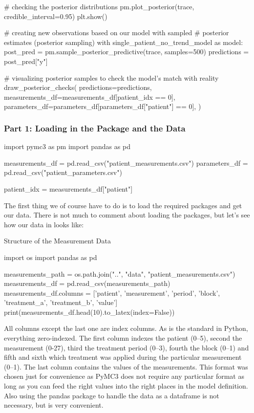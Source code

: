 \documentclass[12pt,a4paper,leqno]{report}
\theoremstyle{plain}
\theoremstyle{definition}
\theoremstyle{remark}
\begin{document}
\begin{pyverbatim}[][fontsize=\footnotesize]
    # checking the posterior distributions
    pm.plot_posterior(trace, credible_interval=0.95)
    plt.show()

 
# creating new observations based on our model with sampled
# posterior estimates (posterior sampling)
with single_patient_no_trend_model as model:
    post_pred = pm.sample_posterior_predictive(trace, samples=500)
    predictions = post_pred["y"]

# visualizing posterior samples to check the model's match with reality
draw_posterior_checks(
    predictions=predictions,
    measurements_df=measurements_df[patient_idx == 0],
    parameters_df=parameters_df[parameters_df["patient"] == 0],
)
\end{pyverbatim}
\smallskip

\subsubsection*{Part 1: Loading in the Package and the Data}

\bigskip
\begin{pyverbatim}[][fontsize=\footnotesize]
import pymc3 as pm
import pandas as pd

measurements_df = pd.read_csv("patient_measurements.csv")
parameters_df = pd.read_csv("patient_parameters.csv")

patient_idx = measurements_df["patient"]
\end{pyverbatim}
\smallskip

The first thing we of course have to do is to load the required packages and get our data. There is
not much to comment about loading the packages, but let's see how our data in
 looks like:

\bigskip
\begin{table}[H]
\caption{Structure of the Measurement Data}\label{measurements}
\bigskip
\centering
\begin{pycode}
import os
import pandas as pd

measurements_path = os.path.join("..", "data", "patient_measurements.csv")
measurements_df = pd.read_csv(measurements_path)
measurements_df.columns = ['patient', 'measurement', 'period', 'block',
'treatment_a', 'treatment_b', 'value']
print(measurements_df.head(10).to_latex(index=False))
\end{pycode}
\end{table}
\bigskip

All columns except the last one are index columns. As is the standard in Python, everything
zero-indexed. The first column indexes the patient (0--5), second the
measurement (0-27), third the treatment period (0--3), fourth the block (0--1) and fifth
and sixth which treatment was applied during the particular measurement (0--1). The last
column contains the values of the measurements. This format was chosen just for
convenience as PyMC3 does not require any particular format as long as you can feed the right values into
the right places in the model definition. Also using the pandas package to handle the
data as a dataframe is not necessary, but is very convenient.
\end{document}
